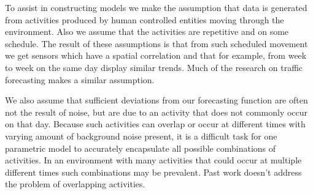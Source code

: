 To assist in constructing models we make the assumption that data is generated from activities produced by human controlled entities moving through the environment.  Also we assume that the activities are repetitive and on some schedule.  The result of these assumptions is that from such scheduled movement we get sensors which have a spatial correlation and that for example, from week to week on the same day display similar trends.   Much of the research on traffic forecasting makes a similar assumption.  

We also assume that sufficient deviations from our forecasting function are often not the result of noise, but are due to an activity that does not commonly occur on that day.  Because such activities can overlap or occur at different times with varying amount of background noise present, it is a difficult task for one parametric model to accurately encapsulate all possible combinations of activities.  In an environment with many activities that could occur at multiple different times such combinations may be prevalent.  Past work doesn't address the problem of overlapping activities.  
%
%
%
%
%
